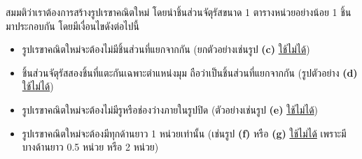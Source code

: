 \question{}

สมมติว่าเราต้องการสร้างรูปเรขาคณิตใหม่ โดยนำชิ้นส่วนจัตุรัสขนาด 1 ตารางหน่วยอย่างน้อย 1 ชิ้นมาประกอบกัน โดยมีเงื่อนไขดังต่อไปนี้
\begin{itemize}
    \item รูปเรขาคณิตใหม่จะต้องไม่มีชิ้นส่วนที่แยกจากกัน
        (ยกตัวอย่างเช่นรูป \textbf{(c)} \uline{ใช้ไม่ได้})
    \item ชิ้นส่วนจัตุรัสสองชิ้นที่แตะกันเฉพาะตำแหน่งมุม ถือว่าเป็นชิ้นส่วนที่แยกจากกัน
        (รูปตัวอย่าง \textbf{(d)} \uline{ใช้ไม่ได้})
    \item รูปเรขาคณิตใหม่จะต้องไม่มีรูหรือช่องว่างภายในรูปปิด 
        (ตัวอย่างเช่นรูป \textbf{(e)} \uline{ใช้ไม่ได้})
    \item รูปเรขาคณิตใหม่จะต้องมีทุกด้านยาว 1 หน่วยเท่านั้น 
        (เช่นรูป \textbf{(f)} หรือ \textbf{(g)} \uline{ใช้ไม่ได้} 
        เพราะมีบางด้านยาว 0.5 หน่วย หรือ 2 หน่วย)
\end{itemize}


